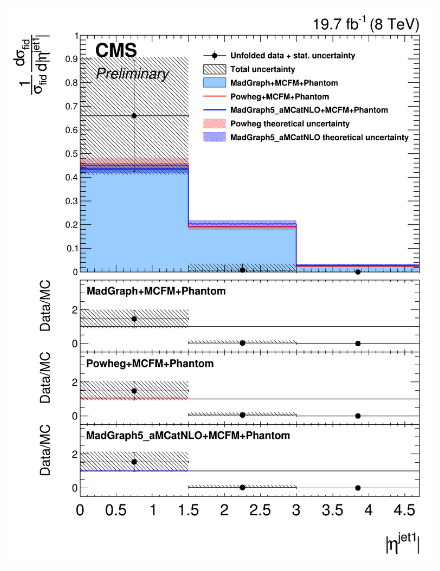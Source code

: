 \begin{figure}[hbtp]
  \begin{center}
    \includegraphics[width=\cmsFigWidth]{Figures/DiffCrossSecZZTo4mEtaJet1_Unfolded_fr_MadGraph_norm.png}     

\end{center}
\end{figure}
